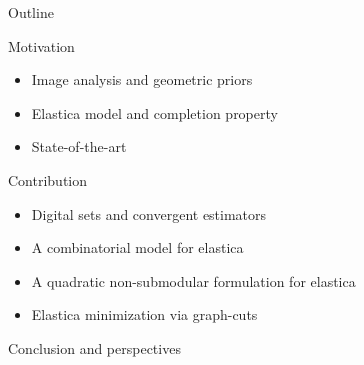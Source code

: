 \begin{frame}
	{Outline}

\begin{enumerate}
	{
	\item{Motivation}
	\begin{itemize}
		\item{Image analysis and geometric priors}
		\item{Elastica model and completion property}		
		\item{State-of-the-art}							
	\end{itemize}}
	\vspace{1em}
	\item{Contribution}
	\begin{itemize}
		\item{Digital sets and convergent estimators}		
		\item{A combinatorial model for elastica}
		\item{A quadratic non-submodular formulation for elastica}	
		\item{Elastica minimization via graph-cuts}	
	\end{itemize}
	\vspace{1em}
	\item{Conclusion and perspectives}
\end{enumerate}

\end{frame}